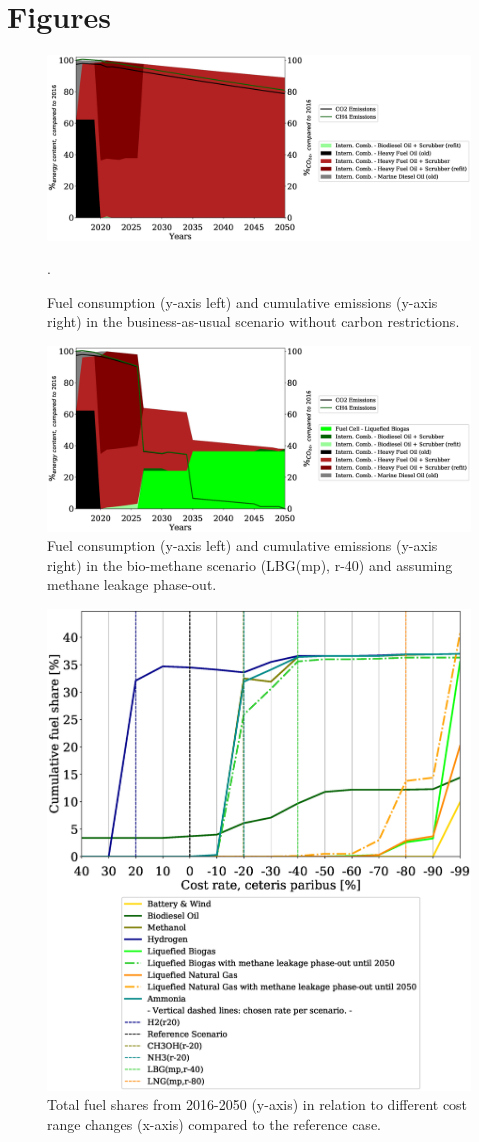 \documentclass[article]{elsarticle}
\begin{document}
\newpage
\section{Figures}
\begin{figure}[h]
    \centering
    \includegraphics[width=\textwidth]{figures/BAU_fuels_emissions.eps}
    \caption{Fuel consumption (y-axis left) and cumulative emissions (y-axis right) in the business-as-usual scenario without carbon restrictions.}
    \label{fig:BAU}.
\end{figure}
\begin{figure}[h]
    \centering
    \includegraphics[width=\textwidth]{figures/LBG_MP_fuels_emissions.eps}
    \caption{Fuel consumption (y-axis left) and cumulative emissions (y-axis right) in the bio-methane scenario (LBG(mp), r-40) and assuming methane leakage phase-out.}
    \label{fig:LBG}
\end{figure}
\begin{figure}[h]
    \centering
    \includegraphics[width=.75\textwidth]{figures/costVariation.eps}
    \caption{Total fuel shares from 2016-2050 (y-axis) in relation to different cost range changes (x-axis) compared to the reference case.}
    \label{fig:costVariation}
\end{figure}
\end{document}
